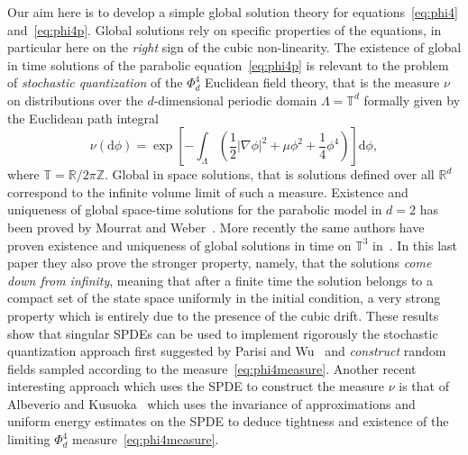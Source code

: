 \documentclass[a4paper,11pt]{article}
\newcommand{\mathd}{\mathrm{d}}
\numberwithin{equation}{section}
\newcommand{\R}{\mathbb{R}}
\newcommand{\8}{\infty}
\begin{document}
Our aim  here is to develop a simple global solution theory for equations~\eqref{eq:phi4} and~\eqref{eq:phi4p}. Global solutions rely on specific properties of the equations, in particular here on the \emph{right} sign of the cubic non-linearity. The existence of  global in time solutions of the parabolic equation~\eqref{eq:phi4p} is relevant to the problem of \emph{stochastic quantization} of the $\Phi^4_d$ Euclidean  field theory, that is the measure $\nu$ on distributions over the $d$-dimensional periodic domain $\Lambda=\mathbb{T}^d$ formally given by the Euclidean path integral
\begin{equation}
\label{eq:phi4measure}
\nu(\mathd \phi)= \exp\left[-\int_{\Lambda} \left(\frac12|\nabla \phi|^2+\mu\phi^2+\frac14\phi^4\right) \right] \mathd \phi,
\end{equation}
where $\mathbb{T}=\R/2\pi \mathbb{Z}$.
Global in space solutions, that is solutions defined over all $\R^d$ correspond to the infinite volume limit of such a measure. Existence and uniqueness of global space-time solutions for the parabolic model in $d=2$ has been proved by Mourrat and Weber~\cite{MW17}. More recently the same authors have proven existence and uniqueness of global solutions in time on $\mathbb{T}^3$ in~\cite{MWcomedown}. In this last paper they also prove the stronger property, namely, that the solutions \emph{come down from infinity}, meaning that after a finite time the solution belongs to a compact set of the state space uniformly in the initial condition, a very strong property which is entirely due to the presence of the  cubic drift. These results show that singular SPDEs can be used to implement rigorously  the stochastic quantization approach first suggested by Parisi and Wu~\cite{parisi_perturbation_1981} and \emph{construct} random fields sampled according to the measure~\eqref{eq:phi4measure}. Another recent interesting approach which uses the SPDE to construct the measure $\nu$ is that of Albeverio and Kusuoka~\cite{albeverio_invariant_2017} which uses the invariance of approximations and uniform energy estimates on the SPDE to deduce tightness and existence of the limiting $\Phi^4_d$ measure~\eqref{eq:phi4measure}. 
\end{document}
